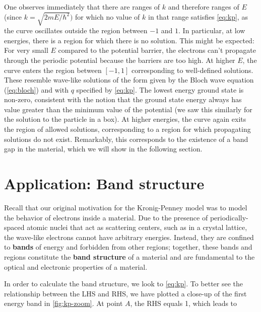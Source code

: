 One observes immediately that there are ranges of $k$ and therefore ranges of $E$ (since $k = \sqrt{2mE/\hbar^2})$ for which no value of $k$ in that range satisfies \autoref{eq:kp}, as the curve oscillates outside the region between $-1$ and $1$. 
In particular, at low energies, there is a region for which there is no solution. 
This might be expected: For very small $E$ compared to the potential barrier, the electrons can't propagate through the periodic potential because the barriers are too high. 
At higher $E$, the curve enters the region between $[-1,1]$ corresponding to well-defined solutions. 
These resemble wave-like solutions of the form given by the Bloch wave equation (\autoref{eq:bloch}) and with $q$ specified by \autoref{eq:kp}. 
The lowest energy ground state is non-zero, consistent with the notion that the ground state energy always has value greater than the minimum value of the potential (we saw this similarly for the solution to the particle in a box). 
At higher energies, the curve again exits the region of allowed solutions, corresponding to a region for which propagating solutions do not exist. 
Remarkably, this corresponds to the existence of a band gap in the material, which we will show in the following section.


\section{Application: Band structure}

Recall that our original motivation for the Kronig-Penney model was to model the behavior of electrons inside a material. 
Due to the presence of periodically-spaced atomic nuclei that act as scattering centers, such as in a crystal lattice, the wave-like electrons cannot have arbitrary energies. 
Instead, they are confined to \textbf{bands} of energy and forbidden from other regions; together, these bands and regions constitute the \textbf{band structure} of a material and are fundamental to the optical and electronic properties of a material. 

In order to calculate the band structure, we look to \autoref{eq:kp}. 
To better see the relationship between the LHS and RHS, we have plotted a close-up of the first energy band in \autoref{fig:kp-zoom}. 
At point $A$, the RHS equals 1, which leads to

